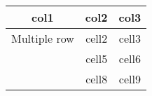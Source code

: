 \documentclass{article}
\begin{document}
\begin{tabular}{|c|c|c|}
  \hline
  col1 & col2 & col3 \\
  \hline
  Multiple row & cell2 & cell3 \\
               & cell5 & cell6 \\
               & cell8 & cell9\\
  \hline
\end{tabular}
\end{document}
